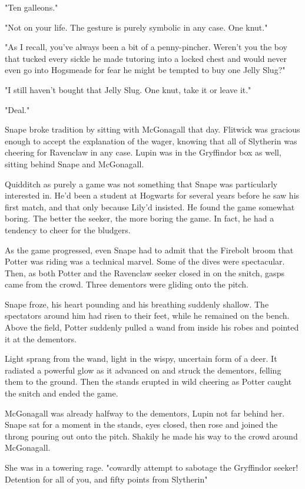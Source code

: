 "Ten galleons."

"Not on your life. The gesture is purely symbolic in any case. One knut."

"As I recall, you've always been a bit of a penny-pincher. Weren't you the boy that tucked every sickle he made tutoring into a locked chest and would never even go into Hogsmeade for fear he might be tempted to buy one Jelly Slug?"

"I still haven't bought that Jelly Slug. One knut, take it or leave it."

"Deal."

Snape broke tradition by sitting with McGonagall that day. Flitwick was gracious enough to accept the explanation of the wager, knowing that all of Slytherin was cheering for Ravenclaw in any case. Lupin was in the Gryffindor box as well, sitting behind Snape and McGonagall.

Quidditch as purely a game was not something that Snape was particularly interested in. He'd been a student at Hogwarts for several years before he saw his first match, and that only because Lily'd insisted. He found the game somewhat boring. The better the seeker, the more boring the game. In fact, he had a tendency to cheer for the bludgers.

As the game progressed, even Snape had to admit that the Firebolt broom that Potter was riding was a technical marvel. Some of the dives were spectacular. Then, as both Potter and the Ravenclaw seeker closed in on the snitch, gasps came from the crowd. Three dementors were gliding onto the pitch.

Snape froze, his heart pounding and his breathing suddenly shallow. The spectators around him had risen to their feet, while he remained on the bench. Above the field, Potter suddenly pulled a wand from inside his robes and pointed it at the dementors.

Light sprang from the wand, light in the wispy, uncertain form of a deer. It radiated a powerful glow as it advanced on and struck the dementors, felling them to the ground. Then the stands erupted in wild cheering as Potter caught the snitch and ended the game.

McGonagall was already halfway to the dementors, Lupin not far behind her. Snape sat for a moment in the stands, eyes closed, then rose and joined the throng pouring out onto the pitch. Shakily he made his way to the crowd around McGonagall.

She was in a towering rage. "{\el}cowardly attempt to sabotage the Gryffindor seeker! Detention for all of you, and fifty points from Slytherin{\el}"

